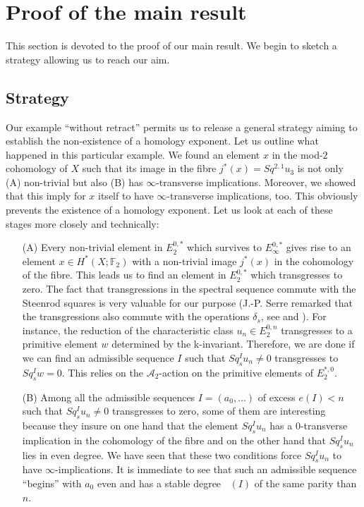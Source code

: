 \documentclass{amsart}
\theoremstyle{definition}
\theoremstyle{remark}
\DeclareMathOperator{\degst}{deg_{st}}
\newcommand{\F}{\mathbb{F}}
\newcommand{\A}{\mathcal{A}}
\begin{document}
\section{Proof of the main result}\label{s:proofs}

This section is devoted to the proof of our main result. We begin to sketch a strategy allowing us to reach our aim.

\subsection*{Strategy}
Our example ``without retract'' permits us to release a general strategy aiming to establish the non-existence of a homology exponent. Let us outline what happened in this particular example. We found an element $x$ in the mod-$2$ cohomology of $X$ such that its image in the fibre $j^*(x)=Sq^{2,1}u_3$ is not only (A) non-trivial but also (B) has $\infty$-transverse implications. Moreover, we showed that this imply for $x$ itself to have $\infty$-transverse implications, too. This obviously prevents the existence of a homology exponent. Let us look at each of these stages more closely and technically:
\begin{itemize}
\item[(A)]{Every non-trivial element in $E_2^{0,*}$ which survives to $E_\infty^{0,*}$ gives rise to an element $x\in H^*(X;\F_2)$ with a non-trivial image $j^*(x)$ in the cohomology of the fibre. This leads us to find an element in $E_2^{0,*}$ which transgresses to zero. The fact that transgressions in the spectral sequence commute with the Steenrod squares is very valuable for our purpose (J.-P. Serre remarked that the transgressions also commute with the operations $\delta_s$, see \cite[p. 206]{Se53} and \cite[p. 457]{Se51}). For instance, the reduction of the characteristic class $u_n\in E_2^{0,n}$ transgresses to a primitive element $w$ determined by the k-invariant. Therefore, we are done if we can find an admissible sequence $I$ such that $Sq^I_s u_n\not=0$ transgresses to $Sq^I_s w=0$. This relies on the $\A_2$-action on the primitive elements of $E_2^{*,0}$.}
\item[(B)]{Among all the admissible sequences $I=(a_0,\dots)$ of excess $e(I)<n$ such that $Sq^I_s u_n\not=0$ transgresses to zero, some of them are interesting because they insure on one hand that the element $Sq^I_s u_n$ has a $0$-transverse implication in the cohomology of the fibre and on the other hand that $Sq^I_s u_n$ lies in even degree. We have seen that these two conditions force $Sq^I_s u_n$ to have $\infty$-implications. It is immediate to see that such an admissible sequence ``begins'' with $a_0$ even and has a stable degree $\degst(I)$ of the same parity than $n$.}
\end{itemize}
\end{document}
